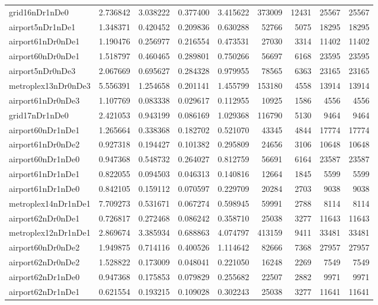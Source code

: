 \documentclass[../../../thesis.tex]{subfiles}
\begin{document}
\begin{longtable}{|l|r|r|r|r|r|r|r|r|}
grid16nDr1nDe0 & 2.736842 & 3.038222 & 0.377400 & 3.415622 & 373009 & 12431 & 25567 & 25567 \\
airport5nDr1nDe1 & 1.348371 & 0.420452 & 0.209836 & 0.630288 & 52766 & 5075 & 18295 & 18295 \\
airport61nDr0nDe1 & 1.190476 & 0.256977 & 0.216554 & 0.473531 & 27030 & 3314 & 11402 & 11402 \\
airport60nDr0nDe1 & 1.518797 & 0.460465 & 0.289801 & 0.750266 & 56697 & 6168 & 23595 & 23595 \\
airport5nDr0nDe3 & 2.067669 & 0.695627 & 0.284328 & 0.979955 & 78565 & 6363 & 23165 & 23165 \\
metroplex13nDr0nDe3 & 5.556391 & 1.254658 & 0.201141 & 1.455799 & 153180 & 4558 & 13914 & 13914 \\
airport61nDr0nDe3 & 1.107769 & 0.083338 & 0.029617 & 0.112955 & 10925 & 1586 & 4556 & 4556 \\
grid17nDr1nDe0 & 2.421053 & 0.943199 & 0.086169 & 1.029368 & 116790 & 5130 & 9464 & 9464 \\
airport60nDr1nDe1 & 1.265664 & 0.338368 & 0.182702 & 0.521070 & 43345 & 4844 & 17774 & 17774 \\
airport61nDr0nDe2 & 0.927318 & 0.194427 & 0.101382 & 0.295809 & 24656 & 3106 & 10648 & 10648 \\
airport60nDr1nDe0 & 0.947368 & 0.548732 & 0.264027 & 0.812759 & 56691 & 6164 & 23587 & 23587 \\
airport61nDr1nDe1 & 0.822055 & 0.094503 & 0.046313 & 0.140816 & 12664 & 1845 & 5599 & 5599 \\
airport61nDr1nDe0 & 0.842105 & 0.159112 & 0.070597 & 0.229709 & 20284 & 2703 & 9038 & 9038 \\
metroplex14nDr1nDe1 & 7.709273 & 0.531671 & 0.067274 & 0.598945 & 59991 & 2788 & 8114 & 8114 \\
airport62nDr0nDe1 & 0.726817 & 0.272468 & 0.086242 & 0.358710 & 25038 & 3277 & 11643 & 11643 \\
metroplex12nDr1nDe1 & 2.869674 & 3.385934 & 0.688863 & 4.074797 & 413159 & 9411 & 33481 & 33481 \\
airport60nDr0nDe2 & 1.949875 & 0.714116 & 0.400526 & 1.114642 & 82666 & 7368 & 27957 & 27957 \\
airport62nDr0nDe2 & 1.528822 & 0.173009 & 0.048041 & 0.221050 & 16248 & 2269 & 7549 & 7549 \\
airport62nDr1nDe0 & 0.947368 & 0.175853 & 0.079829 & 0.255682 & 22507 & 2882 & 9971 & 9971 \\
airport62nDr1nDe1 & 0.621554 & 0.193215 & 0.109028 & 0.302243 & 25038 & 3277 & 11641 & 11641 \\

\end{longtable}
\end{document}
